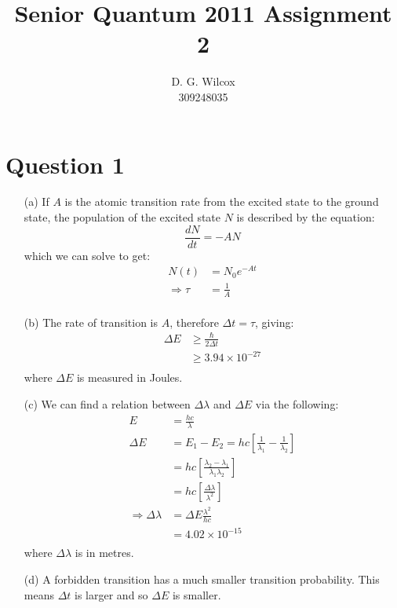 \documentclass[10pt,a4paper]{article}
\title{Senior Quantum 2011 Assignment 2}
\date{}
\author{D. G. Wilcox \\
		309248035}
\begin{document}
\maketitle
\section*{Question 1}
\begin{itemize}
	\item[(a)] If $A$ is the atomic transition rate from the excited state to the ground state, the population of the excited state $N$ is described by the equation:
		\begin{equation*}
			\frac{dN}{dt} = - A N
		\end{equation*}
	which we can solve to get:
		\begin{align*}
			N(t) &= N_{0}e^{-At} \\
			\Rightarrow \tau &= \frac{1}{A} \\
		\end{align*}
	
	\item[(b)] The rate of transition is $A$, therefore $\Delta t = \tau$, giving:
		\begin{align*}
			\Delta E &\geq \frac{\hbar}{2 \Delta t} \\
			&\geq 3.94 \times 10^{-27} \\
		\end{align*}
	where $\Delta E$ is measured in Joules.

	\item[(c)] We can find a relation between $\Delta \lambda$ and $\Delta E$ via the following:
		\begin{align*}
			E &= \frac{hc}{\lambda} \\
			\Delta E &= E_{1} - E_{2} = hc [\frac{1}{\lambda_{1}} - \frac{1}{\lambda_{2}}] \\
			&= hc [\frac{\lambda_{2} - \lambda_{1}}{\lambda_{1}\lambda_{2}}] \\
			&= hc [\frac{\Delta \lambda}{\lambda^{2}}] \\
			\Rightarrow \Delta \lambda &= \Delta E \frac{\lambda^{2}}{hc} \\
			&= 4.02 \times 10^{-15} \\
		\end{align*}
	where $\Delta \lambda$ is in metres.

	\item[(d)] A forbidden transition has a much smaller transition probability. This means $\Delta t$ is larger and so $\Delta E$ is smaller.
\end{itemize}
\end{document}
